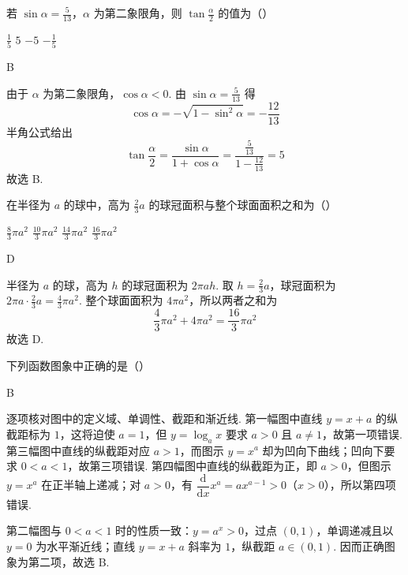 \begin{problem}
若 \(\sin\alpha=\frac{5}{13}\)，\(\alpha\) 为第二象限角，则 \(\tan\frac{\alpha}{2}\) 的值为（\quad）

\choices
    {\(\frac{1}{5}\)}
    {\(5\)}
    {\(-5\)}
    {\(-\frac{1}{5}\)}
\end{problem}

\begin{answer}
B
\end{answer}

\begin{solution}
由于 \(\alpha\) 为第二象限角，\(\cos\alpha<0\). 由 \(\sin\alpha=\frac5{13}\) 得
\[
\cos\alpha=-\sqrt{1-\sin^2\alpha}=-\frac{12}{13}
\]
半角公式给出
\[
\tan\frac\alpha2=\frac{\sin\alpha}{1+\cos\alpha}=\frac{\frac5{13}}{1-\frac{12}{13}}=5
\]
故选 B.
\end{solution}

\begin{problem}
在半径为 \(a\) 的球中，高为 \(\frac{2}{3}a\) 的球冠面积与整个球面面积之和为（\quad）

\choices
    {\(\frac{8}{3}\pi a^2\)}
    {\(\frac{10}{3}\pi a^2\)}
    {\(\frac{14}{3}\pi a^2\)}
    {\(\frac{16}{3}\pi a^2\)}
\end{problem}

\begin{answer}
D
\end{answer}

\begin{solution}
半径为 \(a\) 的球，高为 \(h\) 的球冠面积为 \(2\pi ah\). 取 \(h=\frac23a\)，球冠面积为 \(2\pi a\cdot\frac23a=\frac43\pi a^2\). 整个球面面积为 \(4\pi a^2\)，所以两者之和为
\[
\frac43\pi a^2+4\pi a^2=\frac{16}{3}\pi a^2
\]
故选 D.
\end{solution}

\begin{problem}
下列函数图象中正确的是（\quad）

    {}
    {}
    {}
\end{problem}

\begin{answer}
B
\end{answer}

\begin{solution}
逐项核对图中的定义域、单调性、截距和渐近线. 第一幅图中直线 \(y=x+a\) 的纵截距标为 \(1\)，这将迫使 \(a=1\)，但 \(y=\log_a x\) 要求 \(a>0\) 且 \(a\ne1\)，故第一项错误. 第三幅图中直线的纵截距对应 \(a>1\)，而图示 \(y=x^a\) 却为凹向下曲线；凹向下要求 \(0<a<1\)，故第三项错误. 第四幅图中直线的纵截距为正，即 \(a>0\)，但图示 \(y=x^a\) 在正半轴上递减；对 \(a>0\)，有 \(\dfrac{\mathrm d}{\mathrm dx}x^a=ax^{a-1}>0\)（\(x>0\)），所以第四项错误.

第二幅图与 \(0<a<1\) 时的性质一致：\(y=a^x>0\)，过点 \((0,1)\)，单调递减且以 \(y=0\) 为水平渐近线；直线 \(y=x+a\) 斜率为 \(1\)，纵截距 \(a\in(0,1)\). 因而正确图象为第二项，故选 B.
\end{solution}

